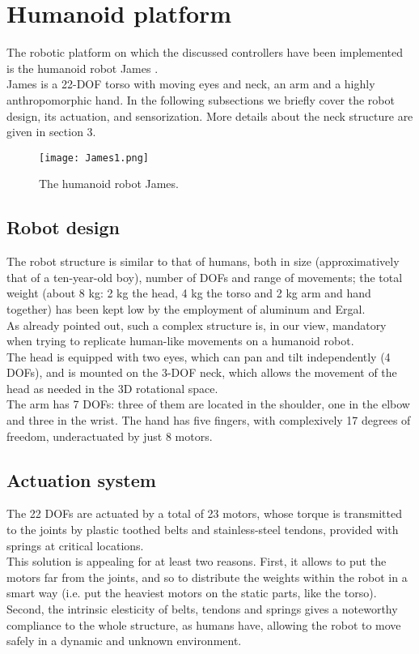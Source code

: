 \documentclass[9pt]{amsart}
\theoremstyle{definition}
\theoremstyle{remark}
\numberwithin{equation}{section}
\begin{document}
\section{Humanoid platform} \label{Sec:Platform}

The robotic platform on which the discussed controllers have been implemented is the humanoid robot James \cite{James06}.\\James is a 22-DOF torso with moving eyes and neck, an arm and a highly anthropomorphic hand. In the following subsections we briefly cover the robot design, its actuation, and sensorization. More details about the neck structure are given in section 3.

\begin{figure}[h!tbp]
\centering
\texttt{[image: James1.png]}
\caption{The humanoid robot James.}
\label{Fig:PicureJames}
\end{figure}

\subsection{Robot design}

The robot structure is similar to that of humans, both in size (approximatively that of a ten-year-old boy), number of DOFs and range of movements; the total weight (about 8 kg: 2 kg the head, 4 kg the torso and 2 kg arm and hand together) has been kept low by the employment of aluminum and Ergal.\\As already pointed out, such a complex structure is, in our view, mandatory when trying to replicate human-like movements on a humanoid robot.\\The head is equipped with two eyes, which can pan and tilt independently (4 DOFs), and is mounted on the 3-DOF neck, which allows the movement of the head as needed in the 3D rotational space.\\The arm has 7 DOFs: three of them are located in the shoulder, one in the elbow and three in the wrist. The hand has five fingers, with complexively 17 degrees of freedom, underactuated by just 8 motors.


\subsection{Actuation system}

The 22 DOFs are actuated by a total of 23 motors, whose torque is transmitted to the joints by plastic toothed belts and stainless-steel tendons, provided with springs at critical locations.\\This solution is appealing for at least two reasons. First, it allows to put the motors far from the joints, and so to distribute the weights within the robot in a smart way (i.e. put the heaviest motors on the static parts, like the torso). Second, the intrinsic elesticity of belts, tendons and springs gives a noteworthy compliance to the whole structure, as humans have, allowing the robot to move safely in a dynamic and unknown environment.
\end{document}
